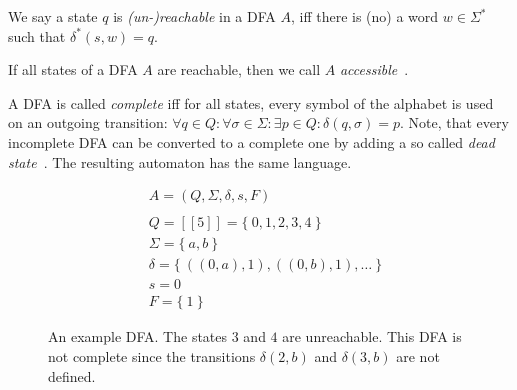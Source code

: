 \begin{definition}\label{ch:1:unreachable-states}
	We say a state $q$ is \emph{(un-)reachable} in a DFA $A$, iff there is (no) a word $w \in \Sigma^*$ such that $\delta^*(s, w) = q$.
\end{definition}
\noindent If all states of a DFA $A$ are reachable, then we call $A$ \emph{accessible}~\cite[p. 2]{CP05}.

A DFA is called \emph{complete} iff for all states, every symbol of the alphabet is used on an outgoing transition: $\forall q\in Q\colon \forall\sigma\in\Sigma\colon \exists p\in Q\colon \delta(q,\sigma) = p$. Note, that every incomplete DFA can be converted to a complete one by adding a so called \emph{dead state}~\cite[p. 67]{HMU01}. The resulting automaton has the same language.

\begin{figure}[H]
	\begin{subfigure}{.5\textwidth}\centering{}\end{subfigure}
	\hfill
	\begin{subfigure}{.4\textwidth}
		\begin{align*}
			&A = (Q, \Sigma, \delta, s ,F) \\
			&\\
			&Q = [[5]] = \{\ 0,1,2,3,4\ \} \\
			&\Sigma = \{\ a,b\ \} \\
			&\delta = \{\ ((0,a),1), ((0,b),1), \ldots\ \} \\
			&s = 0 \\
			&F = \{\ 1\ \}
		\end{align*}
	\end{subfigure}
	\caption{An example DFA. The states $3$ and $4$ are unreachable. This DFA is not complete since the transitions $\delta(2,b)$ and $\delta(3,b)$ are not defined.}
	\label{fig:dfa}
\end{figure}

